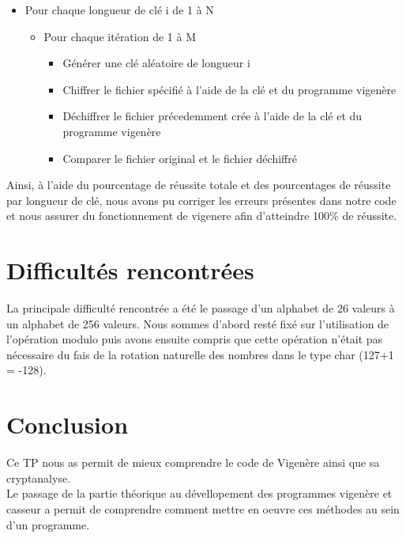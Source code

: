 \documentclass[a4paper, 11pt, oneside]{article}
\begin{document}
\begin{itemize}
 \item Pour chaque longueur de clé i de 1 à N
 \begin{itemize}
  \item Pour chaque itération de 1 à M
  \begin{itemize}
   \item Générer une clé aléatoire de longueur i
   \item Chiffrer le fichier spécifié à l'aide de la clé et du programme vigenère
   \item Déchiffrer le fichier précedemment crée à l'aide de la clé et du programme vigenère
   \item Comparer le fichier original et le fichier déchiffré
  \end{itemize}

 \end{itemize}

\end{itemize}
\vspace{0.5em}

Ainsi, à l'aide du pourcentage de réussite totale et des pourcentages de réussite par longueur de clé, nous avons pu corriger les erreurs présentes dans notre code et nous assurer du fonctionnement de vigenere afin d'atteindre 100\% de réussite.

\section{Difficultés rencontrées}

La principale difficulté rencontrée a été le passage d'un alphabet de 26 valeurs à un alphabet de 256 valeurs. Nous sommes d'abord resté fixé sur l'utilisation de l'opération modulo puis avons ensuite compris que cette opération n'était pas nécessaire du fais de la rotation naturelle des  nombres dans le type char (127+1 = -128).

\section*{Conclusion}

Ce TP nous as permit de mieux comprendre le code de Vigenère ainsi que sa cryptanalyse.\\
Le passage de la partie théorique au dévellopement des programmes vigenère et casseur a permit de comprendre comment mettre en oeuvre ces méthodes au sein d'un programme.
\end{document}
